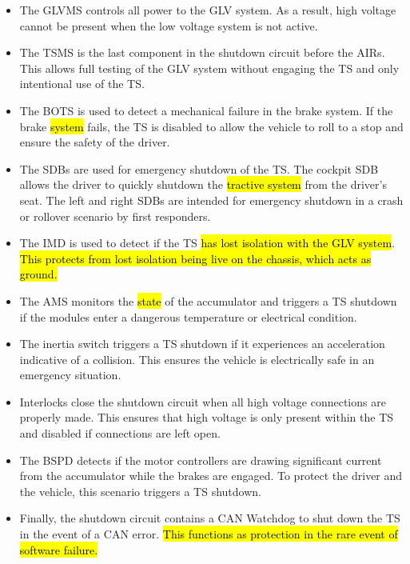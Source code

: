\documentclass{article}
\DeclareRobustCommand{\hlr}[1]{{\sethlcolor{red}\hl{#1}}}
\begin{document}
                \begin{itemize}
                    \item The GLVMS controls all power to the GLV system. As a result, high voltage cannot be present when the low voltage system is not active.
                    \item The TSMS is the last component in the shutdown circuit before the AIRs. This allows full testing of the GLV system without engaging the TS and only intentional use of the TS.
                    \item The BOTS is used to detect a mechanical failure in the brake system. If the brake \hlr{system} fails, the TS is disabled to allow the vehicle to roll to a stop and ensure the safety of the driver.
                    \item The SDBs are used for emergency shutdown of the TS. The cockpit SDB allows the driver to quickly shutdown the \hlr{tractive system} from the driver's seat. The left and right SDBs are intended for emergency shutdown in a crash or rollover scenario by first responders.
                    \item The IMD is used to detect if the TS \hlr{has lost isolation with the GLV system}. \hlr{This protects from lost isolation being live on the chassis, which acts as ground.}
                    \item The AMS monitors the \hlr{state} of the accumulator and triggers a TS shutdown if the modules enter a dangerous temperature or electrical condition.
                    \item The inertia switch triggers a TS shutdown if it experiences an acceleration indicative of a collision. This ensures the vehicle is electrically safe in an emergency situation.
                    \item Interlocks close the shutdown circuit when all high voltage connections are properly made. This ensures that high voltage is only present within the TS and disabled if connections are left open.
                    \item The BSPD detects if the motor controllers are drawing significant current from the accumulator while the brakes are engaged. To protect the driver and the vehicle, this scenario triggers a TS shutdown.
                    \item Finally, the shutdown circuit contains a CAN Watchdog to shut down the TS in the event of a CAN error. \hlr{This functions as protection in the rare event of software failure.}
                \end{itemize}
\end{document}

